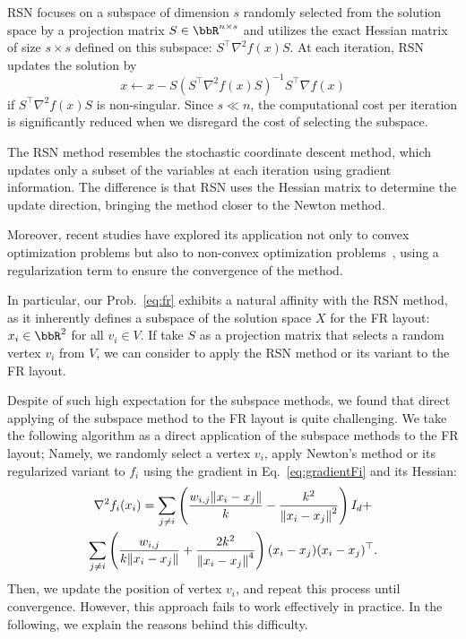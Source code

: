 \documentclass[dvipdfmx,10pt,journal,compsoc]{IEEEtran}
\begin{document}
RSN focuses on a subspace of dimension $s$ randomly selected from the solution space by a projection matrix $S \in \bbR^{n \times s}$ and utilizes the exact Hessian matrix of size $s \times s$ defined on this subspace: $S^\top \nabla^2 f(x) S$.
At each iteration, RSN updates the solution by
\begin{equation*}
    x \gets x - S (S^\top \nabla^2 f(x) S)^{-1} S^\top \nabla f(x)
\end{equation*}
if $S^\top \nabla^2 f(x) S$ is non-singular.
Since $s \ll n$, the computational cost per iteration is significantly reduced when we disregard the cost of selecting the subspace.

The RSN method resembles the stochastic coordinate descent method, which updates only a subset of the variables at each iteration using gradient information.
The difference is that RSN uses the Hessian matrix to determine the update direction, bringing the method closer to the Newton method.

Moreover, recent studies have explored its application not only to convex optimization problems but also to non-convex optimization problems~\cite{fujiRandomizedSubspaceRegularized2022}, using a regularization term to ensure the convergence of the method.

In particular, our Prob.~\eqref{eq:fr} exhibits a natural affinity with the RSN method, as it inherently defines a subspace of the solution space $X$ for the FR layout: $x_i \in \bbR^2$ for all $v_i \in V$.
If take $S$ as a projection matrix that selects a random vertex $v_i$ from $V$, we can consider to apply the RSN method or its variant to the FR layout.

Despite of such high expectation for the subspace methods, we found that direct applying of the subspace method to the FR layout is quite challenging.
We take the following algorithm as a direct application of the subspace methods to the FR layout; Namely, we randomly select a vertex $v_i$, apply Newton's method or its regularized variant to $f_i$ using the gradient in Eq.~\eqref{eq:gradientFi} and its Hessian:
\begin{gather*}
    \nabla^2 f_i(x_i) = \sum_{j \neq i} \left(\frac{w_{i,j}\norm{x_i - x_j}}{k} - \frac{k^2}{\norm{x_i - x_j}^2}\right) I_d + \\
    \sum_{j \neq i} \left(\frac{w_{i,j}}{k \norm{x_i - x_j}} + \frac{2k^2}{\norm{x_i - x_j}^4}\right) (x_i - x_j)(x_i - x_j)^\top.
\end{gather*}
Then, we update the position of vertex $v_i$, and repeat this process until convergence.
However, this approach fails to work effectively in practice.
In the following, we explain the reasons behind this difficulty.
\end{document}
